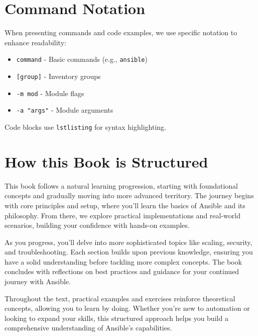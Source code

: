 \section*{Command Notation}

When presenting commands and code examples, we use specific notation to enhance readability:
\begin{itemize}
    \item \texttt{command} - Basic commands (e.g., \texttt{ansible})
    \item \texttt{[group]} - Inventory groups
    \item \texttt{-m mod} - Module flags
    \item \texttt{-a "args"} - Module arguments
\end{itemize}

Code blocks use \texttt{lstlisting} for syntax highlighting.

\section*{How this Book is Structured}

This book follows a natural learning progression, starting with foundational concepts and gradually moving into more advanced territory. The journey begins with core principles and setup, where you'll learn the basics of Ansible and its philosophy. From there, we explore practical implementations and real-world scenarios, building your confidence with hands-on examples.

As you progress, you'll delve into more sophisticated topics like scaling, security, and troubleshooting. Each section builds upon previous knowledge, ensuring you have a solid understanding before tackling more complex concepts. The book concludes with reflections on best practices and guidance for your continued journey with Ansible.

Throughout the text, practical examples and exercises reinforce theoretical concepts, allowing you to learn by doing. Whether you're new to automation or looking to expand your skills, this structured approach helps you build a comprehensive understanding of Ansible's capabilities.

\clearpage